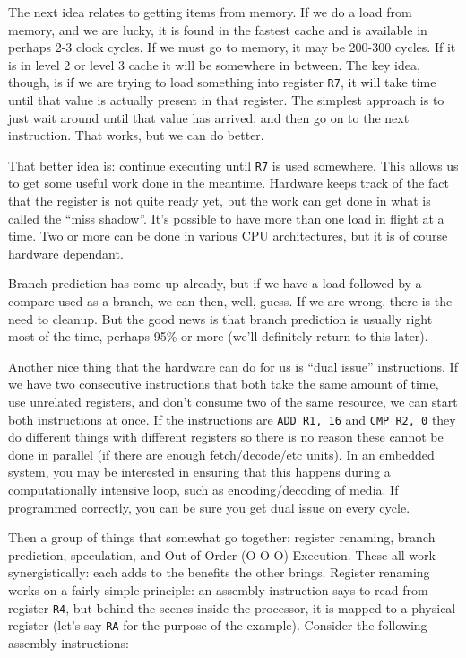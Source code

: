 \documentclass[a4paper]{report}
\begin{document}
The next idea relates to getting items from memory. If we do a load from memory, and we are lucky, it is found in the fastest cache and is available in perhaps 2-3 clock cycles. If we must go to memory, it may be 200-300 cycles. If it is in level 2 or level 3 cache it will be somewhere in between. The key idea, though, is if we are trying to load something into register \texttt{R7}, it will take time until that value is actually present in that register. The simplest approach is to just wait around until that value has arrived, and then go on to the next instruction. That works, but we can do better.

That better idea is: continue executing until \texttt{R7} is used somewhere. This allows us to get some useful work done in the meantime. Hardware keeps track of the fact that the register is not quite ready yet, but the work can get done in what is called the ``miss shadow''. It's possible to have more than one load in flight at a time. Two or more can be done in various CPU architectures, but it is of course hardware dependant. 

Branch prediction has come up already, but if we have a load followed by a compare used as a branch, we can then, well, guess. If we are wrong, there is the need to cleanup. But the good news is that branch prediction is usually right most of the time, perhaps 95\% or more (we'll definitely return to this later).

Another nice thing that the hardware can do for us is ``dual issue'' instructions. If we have two consecutive instructions that both take the same amount of time, use unrelated registers, and don't consume two of the same resource, we can start both instructions at once. If the instructions are \texttt{ADD R1, 16} and \texttt{CMP R2, 0} they do different things with different registers so there is no reason these cannot be done in parallel (if there are enough fetch/decode/etc units). In an embedded system, you may be interested in ensuring that this happens during a computationally intensive loop, such as encoding/decoding of media. If programmed correctly, you can be sure you get dual issue on every cycle.

Then a group of things that somewhat go together: register renaming, branch prediction, speculation, and Out-of-Order (O-O-O) Execution. These all work synergistically: each adds to the benefits the other brings. Register renaming works on a fairly simple principle: an assembly instruction says to read from register \texttt{R4}, but behind the scenes inside the processor, it is mapped to a physical register (let's say \texttt{RA} for the purpose of the example). Consider the following assembly instructions:
\end{document}
